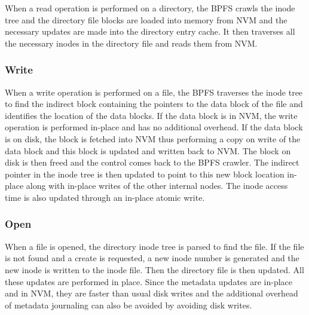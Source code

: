 When a read operation is performed on a directory, the BPFS crawls the inode tree and the directory file blocks are loaded into memory from NVM and the necessary updates are made into the directory entry cache. It then traverses all the necessary inodes in the directory file and reads them from NVM.

\subsubsection{Write}
When a write operation is performed on a file, the BPFS traverses the inode tree to find the indirect block containing the pointers to the data block of the file and identifies the location of the data blocks. If the data block is in NVM, the write operation is performed in-place and has no additional overhead. If the data block is on disk, the block is fetched into NVM thus performing a copy on write of the data block and this block is updated and written back to NVM. The block on disk is then freed and the control comes back to the BPFS crawler. The indirect pointer in the inode tree is then updated to point to this new block location in-place along with in-place writes of the other internal nodes. The inode access time is also updated through an in-place atomic write.

\subsubsection{Open}
When a file is opened, the directory inode tree is parsed to find the file. If the file is not found and a create is requested, a new inode number is generated and the new inode is written to the inode file. Then the directory file is then updated. All these updates are performed in place. Since the metadata updates are in-place and in NVM, they are faster than usual disk writes and the additional overhead of metadata journaling can also be avoided by avoiding disk writes.
